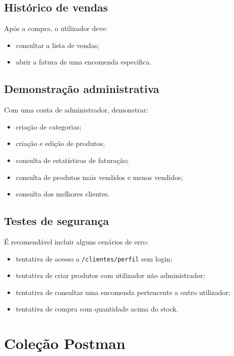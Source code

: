 \documentclass[10pt,a4paper]{report}
\begin{document}
\subsection{Histórico de vendas}

Após a compra, o utilizador deve:

\begin{itemize}
    \item consultar a lista de vendas;
    \item abrir a fatura de uma encomenda específica.
\end{itemize}

\subsection{Demonstração administrativa}

Com uma conta de administrador, demonstrar:

\begin{itemize}
    \item criação de categorias;
    \item criação e edição de produtos;
    \item consulta de estatísticas de faturação;
    \item consulta de produtos mais vendidos e menos vendidos;
    \item consulta dos melhores clientes.
\end{itemize}

\subsection{Testes de segurança}

É recomendável incluir alguns cenários de erro:

\begin{itemize}
    \item tentativa de acesso a \texttt{/clientes/perfil} sem login;
    \item tentativa de criar produtos com utilizador não administrador;
    \item tentativa de consultar uma encomenda pertencente a outro utilizador;
    \item tentativa de compra com quantidade acima do stock.
\end{itemize}

\section{Coleção Postman}
\end{document}
